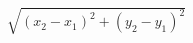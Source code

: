 \documentclass{article}
\begin{document}
$\sqrt{(x_2-x_1)^2+(y_2-y_1)^2}$
\pagebreak
\end{document}
